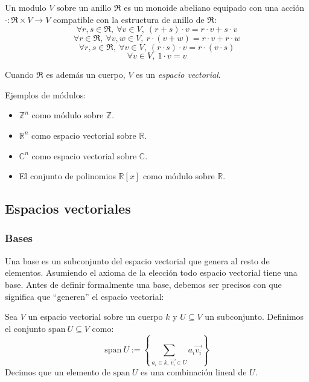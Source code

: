 \documentclass[10pt]{article}
\newcommand{\spn}{\mathrm{span}\:}
\newcommand{\Z}{\mathbb{Z}}
\newcommand{\R}{\mathbb{R}}
\newcommand{\C}{\mathbb{C}}
\begin{document}
\begin{definition}
  Un modulo $ V $ sobre un anillo $ \mathfrak{R} $ es un monoide abeliano equipado con una acción
  $ \cdot : \mathfrak{R} \times V \to V $ compatible con la estructura de anillo de $ \mathfrak{R} $:
  \[ \forall r, s \in \mathfrak{R}, \ \forall v \in V, \ (r + s) \cdot v = r \cdot v + s \cdot v \]
  \[ \forall r \in \mathfrak{R}, \ \forall v, w \in V, \ r \cdot (v + w) = r \cdot v + r \cdot w \]
  \[ \forall r, s \in \mathfrak{R}, \ \forall v \in V, \ (r \cdot s) \cdot v = r \cdot (v \cdot s) \]
  \[ \forall v \in V, \ 1 \cdot v = v \]
\end{definition}

Cuando $ \mathfrak{R} $ es además un cuerpo, $ V $ es un \textit{espacio vectorial}.

\begin{example}[Módulos]
  Ejemplos de módulos:
  \begin{itemize}
    \item $\Z^n$ como módulo sobre $\Z$.
    \item $\R^n$ como espacio vectorial sobre $\R$.
    \item $\C^n$ como espacio vectorial sobre $\C$.
    \item El conjunto de polinomios $\R[x]$ como módulo sobre $\R$.
  \end{itemize}
\end{example}

\subsection{Espacios vectoriales}

\subsubsection{Bases}

Una base es un subconjunto del espacio vectorial que genera al resto de elementos. Asumiendo el axioma de la elección todo espacio vectorial tiene una base. Antes de definir formalmente una base, debemos ser precisos con que significa que ``generen'' el espacio vectorial:

\begin{definition}
  Sea $ V $ un espacio vectorial sobre un cuerpo $ k $ y $ U \subseteq V $ un subconjunto. Definimos el conjunto $ \spn U \subseteq V $ como:
  \[ \spn U := \left\{ \sum_{a_i \in k,\, \vec{v_i} \in U} a_i \vec{v_i} \right\} \]
  Decimos que un elemento de $ \spn U $ es una combinación lineal de $ U $.
\end{definition}
\end{document}

